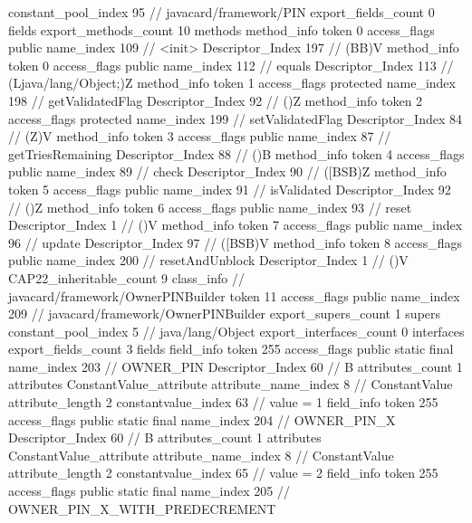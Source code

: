 {{{{				constant_pool_index	95		// javacard/framework/PIN
			}
			export_fields_count	0
			fields {
			}
			export_methods_count	10
			methods {
				method_info {
					token	0
					access_flags	public
					name_index	109		// <init>
					Descriptor_Index	197		// (BB)V
				}
				method_info {
					token	0
					access_flags	public
					name_index	112		// equals
					Descriptor_Index	113		// (Ljava/lang/Object;)Z
				}
				method_info {
					token	1
					access_flags	protected
					name_index	198		// getValidatedFlag
					Descriptor_Index	92		// ()Z
				}
				method_info {
					token	2
					access_flags	protected
					name_index	199		// setValidatedFlag
					Descriptor_Index	84		// (Z)V
				}
				method_info {
					token	3
					access_flags	public
					name_index	87		// getTriesRemaining
					Descriptor_Index	88		// ()B
				}
				method_info {
					token	4
					access_flags	public
					name_index	89		// check
					Descriptor_Index	90		// ([BSB)Z
				}
				method_info {
					token	5
					access_flags	public
					name_index	91		// isValidated
					Descriptor_Index	92		// ()Z
				}
				method_info {
					token	6
					access_flags	public
					name_index	93		// reset
					Descriptor_Index	1		// ()V
				}
				method_info {
					token	7
					access_flags	public
					name_index	96		// update
					Descriptor_Index	97		// ([BSB)V
				}
				method_info {
					token	8
					access_flags	public
					name_index	200		// resetAndUnblock
					Descriptor_Index	1		// ()V
				}
			}
			CAP22_inheritable_count	9
		}
		class_info {		// javacard/framework/OwnerPINBuilder
			token	11
			access_flags	public
			name_index	209		// javacard/framework/OwnerPINBuilder
			export_supers_count	1
			supers {
				constant_pool_index	5		// java/lang/Object
			}
			export_interfaces_count	0
			interfaces {
			}
			export_fields_count	3
			fields {
			field_info {
				token	255
				access_flags	public static final
				name_index	203		// OWNER_PIN
				Descriptor_Index	60		// B
				attributes_count	1
				attributes {
				ConstantValue_attribute {
					attribute_name_index	8		// ConstantValue
					attribute_length	2
					constantvalue_index	63		// value = 1
				}
				}
			}
			field_info {
				token	255
				access_flags	public static final
				name_index	204		// OWNER_PIN_X
				Descriptor_Index	60		// B
				attributes_count	1
				attributes {
				ConstantValue_attribute {
					attribute_name_index	8		// ConstantValue
					attribute_length	2
					constantvalue_index	65		// value = 2
				}
				}
			}
			field_info {
				token	255
				access_flags	public static final
				name_index	205		// OWNER_PIN_X_WITH_PREDECREMENT
}}}}}
